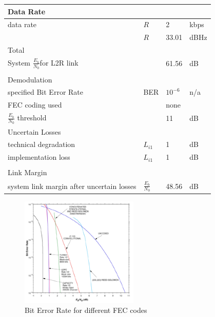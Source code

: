 \begin{table}[]
\begin{tabular}{llll}
\multicolumn{4}{l}{\cellcolor[HTML]{DAE8FC}Data Rate}                            \\ \hline
data rate                                 &${R}$   		& 2                      & kbps \\
                                          &${R}$ 		& 33.01                  & dBHz \\ \hline
\multicolumn{4}{l}{\cellcolor[HTML]{DAE8FC}Total}                                \\ \hline
System $\frac{{E}_{b}}{{N}_{0}}$for L2R link &      		& 61.56                  & dB   \\
\multicolumn{4}{l}{}                                                             \\ \hline
\multicolumn{4}{l}{\cellcolor[HTML]{DAE8FC}Demodulation}                         \\ \hline
specified Bit Error Rate                  &BER      		& $10^{-6}$ 			  & n/a  \\
FEC coding used                           &      		& none                   &      \\
$\frac{{E}_{b}}{{N}_{0}}$ threshold       &				& 11                     & dB   \\ \hline
\multicolumn{4}{l}{\cellcolor[HTML]{DAE8FC}Uncertain Losses}                     \\ \hline
technical degradation                     &${L}_{i1}$	& 1                      & dB   \\
implementation loss                       &${L}_{i1}$	& 1                      & dB   \\
\multicolumn{4}{l}{}                                                             \\ \hline
\multicolumn{4}{l}{\cellcolor[HTML]{DAE8FC}Link Margin}                          \\ \hline
system link margin after uncertain losses &$\frac{{E}_{b}}{{N}_{0}}$	& 48.56      & dB  
\end{tabular}
\end{table}

\begin{figure}[h]
	\centering
  		\includegraphics[width=0.5\textwidth]{Media/Bit_Error_Rate.png}
  \caption{Bit Error Rate for different FEC codes}
  \label{fig:BitErrorRate}
\end{figure}

